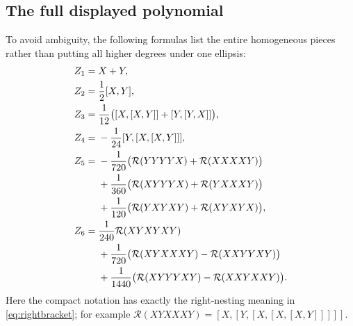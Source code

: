 \documentclass[11pt]{article}
\theoremstyle{definition}
\theoremstyle{remark}
\newcommand{\Rbr}{\mathcal R}
\numberwithin{equation}{section}
\begin{document}
\subsection{The full displayed polynomial}
To avoid ambiguity, the following formulas list the entire homogeneous pieces rather than putting all higher degrees under one ellipsis:
\begin{align}
 Z_1={}&X+Y,\label{eq:z1}\\
 Z_2={}&\frac12[X,Y],\label{eq:z2}\\
 Z_3={}&\frac1{12}\bigl([X,[X,Y]]+[Y,[Y,X]]\bigr),\label{eq:z3}\\
 Z_4={}&-\frac1{24}[Y,[X,[X,Y]]],\label{eq:z4}\\
 Z_5={}&-\frac1{720}\bigl(\Rbr(YYYYX)+\Rbr(XXXXY)\bigr)\notag\\
 &+\frac1{360}\bigl(\Rbr(XYYYX)+\Rbr(YXXXY)\bigr)\notag\\
 &+\frac1{120}\bigl(\Rbr(YXYXY)+\Rbr(XYXYX)\bigr),\label{eq:z5}\\
 Z_6={}&\frac1{240}\Rbr(XYXYXY)\notag\\
 &+\frac1{720}\bigl(\Rbr(XYXXXY)-\Rbr(XXYYXY)\bigr)\notag\\
 &+\frac1{1440}\bigl(\Rbr(XYYYXY)-\Rbr(XXYXXY)\bigr).\label{eq:z6}
\end{align}
Here the compact notation has exactly the right-nesting meaning in \eqref{eq:rightbracket}; for example $\Rbr(XYXXXY)=[X,[Y,[X,[X,[X,Y]]]]]$.
\end{document}

